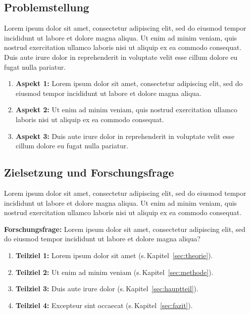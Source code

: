 \subsection{Problemstellung}
\label{sec:problemstellung}

Lorem ipsum dolor sit amet, consectetur adipiscing elit, sed do eiusmod tempor
incididunt ut labore et dolore magna aliqua. Ut enim ad minim veniam, quis nostrud
exercitation ullamco laboris nisi ut aliquip ex ea commodo consequat. Duis aute
irure dolor in reprehenderit in voluptate velit esse cillum dolore eu fugat nulla
pariatur.\autocite[Vgl.][S. 42]{muster:buch:2023}

\begin{enumerate}
	\item \textbf{Aspekt 1:} Lorem ipsum dolor sit amet, consectetur adipiscing
		elit, sed do eiusmod tempor incididunt ut labore et dolore magna aliqua.
	\item \textbf{Aspekt 2:} Ut enim ad minim veniam, quis nostrud exercitation
		ullamco laboris nisi ut aliquip ex ea commodo consequat.
	\item \textbf{Aspekt 3:} Duis aute irure dolor in reprehenderit in voluptate
		velit esse cillum dolore eu fugat nulla pariatur.
\end{enumerate}


\subsection{Zielsetzung und Forschungsfrage}
\label{sec:zielsetzung}

Lorem ipsum dolor sit amet, consectetur adipiscing elit, sed do eiusmod tempor
incididunt ut labore et dolore magna aliqua. Ut enim ad minim veniam, quis nostrud
exercitation ullamco laboris nisi ut aliquip ex ea commodo consequat.

\begin{framed}
	\noindent\textbf{Forschungsfrage:} Lorem ipsum dolor sit amet, consectetur
	adipiscing elit, sed do eiusmod tempor incididunt ut labore et dolore magna
	aliqua?
\end{framed}

\begin{enumerate}
	\item \textbf{Teilziel 1:} Lorem ipsum dolor sit amet (s.\,Kapitel~\ref{sec:theorie}).
	\item \textbf{Teilziel 2:} Ut enim ad minim veniam (s.\,Kapitel~\ref{sec:methode}).
	\item \textbf{Teilziel 3:} Duis aute irure dolor (s.\,Kapitel~\ref{sec:hauptteil}).
	\item \textbf{Teilziel 4:} Excepteur sint occaecat (s.\,Kapitel~\ref{sec:fazit}).
\end{enumerate}


